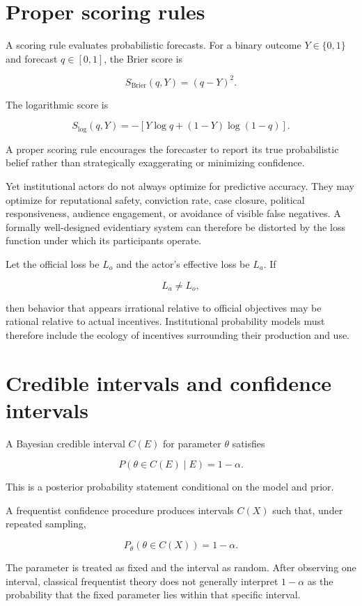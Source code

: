 \section{Proper scoring rules}
\label{sec:a20}

A scoring rule evaluates probabilistic forecasts. For a binary outcome \(Y\in\{0,1\}\) and forecast \(q\in[0,1]\), the Brier score is

\[
S_{\mathrm{Brier}}(q,Y)
=
(q-Y)^2.
\]

The logarithmic score is

\[
S_{\log}(q,Y)
=
-\left[
Y\log q+(1-Y)\log(1-q)
\right].
\]

A proper scoring rule encourages the forecaster to report its true probabilistic belief rather than strategically exaggerating or minimizing confidence.

Yet institutional actors do not always optimize for predictive accuracy. They may optimize for reputational safety, conviction rate, case closure, political responsiveness, audience engagement, or avoidance of visible false negatives. A formally well-designed evidentiary system can therefore be distorted by the loss function under which its participants operate.

Let the official loss be \(L_o\) and the actor's effective loss be \(L_a\). If

\[
L_a\neq L_o,
\]

then behavior that appears irrational relative to official objectives may be rational relative to actual incentives. Institutional probability models must therefore include the ecology of incentives surrounding their production and use.

\section{Credible intervals and confidence intervals}
\label{sec:a21}

A Bayesian credible interval \(C(E)\) for parameter \(\theta\) satisfies

\[
P(\theta\in C(E)\mid E)=1-\alpha.
\]

This is a posterior probability statement conditional on the model and prior.

A frequentist confidence procedure produces intervals \(C(X)\) such that, under repeated sampling,

\[
P_\theta(\theta\in C(X))=1-\alpha.
\]

The parameter is treated as fixed and the interval as random. After observing one interval, classical frequentist theory does not generally interpret \(1-\alpha\) as the probability that the fixed parameter lies within that specific interval.

